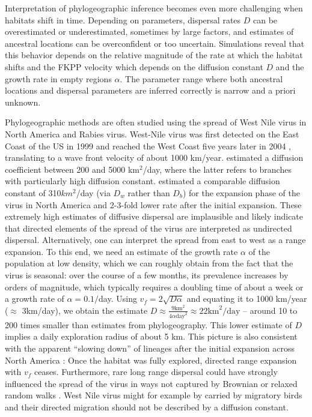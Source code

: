 \documentclass[aps,rmp, twocolumn]{revtex4}
\newcommand{\vfkpp}{v_f}
\begin{document}
Interpretation of phylogeographic inference becomes even more challenging when habitats shift in time.
Depending on parameters, dispersal rates $D$ can be overestimated or underestimated, sometimes by large factors, and estimates of ancestral locations can be overconfident or too uncertain.
Simulations reveal that this behavior depends on the relative magnitude of the rate at which the habitat shifts and the FKPP velocity which depends on the diffusion constant $D$ and the growth rate in empty regions $\alpha$.
The parameter range where both ancestral locations and dispersal parameters are inferred correctly is narrow and a priori unknown.

Phylogeographic methods are often studied using the spread of West Nile virus in North America and Rabies virus.
West-Nile virus was first detected on the East Coast of the US in 1999 and reached the West Coast five years later in 2004 \citep{pybus_unifying_2012}, translating to a wave front velocity of about 1000 km/year.
\citet{pybus_unifying_2012} estimated a diffusion coefficient between 200 and 5000 km$^2$/day, where the latter refers to branches with particularly high diffusion constant.
\citet{dellicour_how_2024} estimated a comparable diffusion constant of 310$km^2$/day (via $D_w$ rather than $D_b$) for the expansion phase of the virus in North America and 2-3-fold lower rate after the initial expansion.
These extremely high estimates of diffusive dispersal are implausible and likely indicate that directed elements of the spread of the virus are interpreted as undirected dispersal.
Alternatively, one can interpret the spread from east to west as a range expansion.
To this end, we need an estimate of the growth rate $\alpha$ of the population at low density, which we can roughly obtain from the fact that the virus is seasonal: over the course of a few months, its prevalence increases by orders of magnitude, which typically requires a doubling time of about a week or a growth rate of $\alpha=0.1/$day.
Using $\vfkpp = 2\sqrt{D\alpha}$ and equating it to 1000 km/year ($\approx$ 3km/day), we obtain the estimate $D\approx \frac{9 \mathrm{km}^2}{4 \alpha \mathrm{day}^2} \approx 22\mathrm{km}^2/\mathrm{day}$ -- around 10 to 200 times smaller than estimates from phylogeography.
This lower estimate of $D$ implies a daily exploration radius of about 5 km.
This picture is also consistent with the apparent ``slowing down'' of lineages after the initial expansion across North America \citep{dellicour_epidemiological_2020, dellicour_how_2024}: Once the habitat was fully explored, directed range expansion with $\vfkpp$ ceases.
Furthermore, rare long range dispersal could have strongly influenced the spread of the virus in ways not captured by Brownian or relaxed random walks \citep{hallatschek_acceleration_2014}.
West Nile virus might for example by carried by migratory birds and their directed migration should not be described by a diffusion constant.
\end{document}

